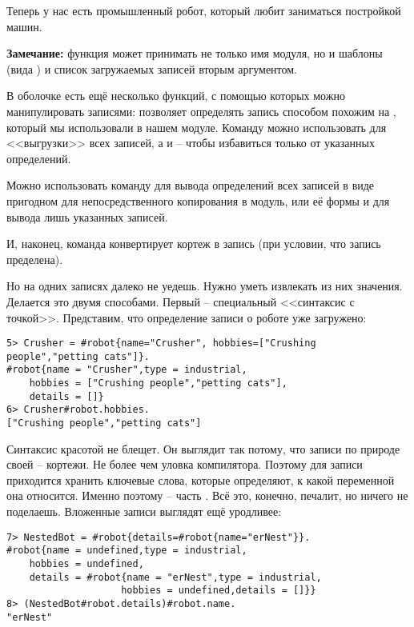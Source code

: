 Теперь у нас есть промышленный робот, который любит заниматься постройкой машин.\\
\colorbox{lgray}
{
\begin{minipage}{1.0\linewidth}
    \textbf{Замечание:}  функция  может принимать не только имя модуля, но и шаблоны (вида ) и список загружаемых записей вторым аргументом.

    В оболочке есть ещё несколько функций, с помощью которых можно манипулировать записями:  позволяет определять запись способом похожим на , который мы использовали в нашем модуле.
    Команду  можно использовать для <<выгрузки>> всех записей, а  и  \--- чтобы избавиться только от указанных определений.

    Можно использовать команду  для вывода определений всех записей в виде пригодном для непосредственного копирования в модуль, или её формы  и  для вывода лишь указанных записей.

    И, наконец, команда  конвертирует кортеж в запись (при условии, что запись пределена).
\end{minipage}
}

Но на одних записях далеко не уедешь.
Нужно уметь извлекать из них значения.
Делается это двумя способами.
Первый \--- специальный <<синтаксис с точкой>>.
Представим, что определение записи о роботе уже загружено:
\begin{lstlisting}[style=erlang]
5> Crusher = #robot{name="Crusher", hobbies=["Crushing people","petting cats"]}.
#robot{name = "Crusher",type = industrial,
    hobbies = ["Crushing people","petting cats"],
    details = []}
6> Crusher#robot.hobbies.
["Crushing people","petting cats"]
\end{lstlisting}

Синтаксис красотой не блещет.
Он выглядит так потому, что записи по природе своей \--- кортежи.
Не более чем уловка компилятора.
Поэтому для записи приходится хранить ключевые слова, которые определяют, к какой переменной она относится. Именно поэтому  \--- часть .
Всё это, конечно, печалит, но ничего не поделаешь.
Вложенные записи выглядят ещё уродливее:
\begin{lstlisting}[style=erlang]
7> NestedBot = #robot{details=#robot{name="erNest"}}.
#robot{name = undefined,type = industrial,
    hobbies = undefined,
    details = #robot{name = "erNest",type = industrial,
                    hobbies = undefined,details = []}}
8> (NestedBot#robot.details)#robot.name.
"erNest"
\end{lstlisting}

